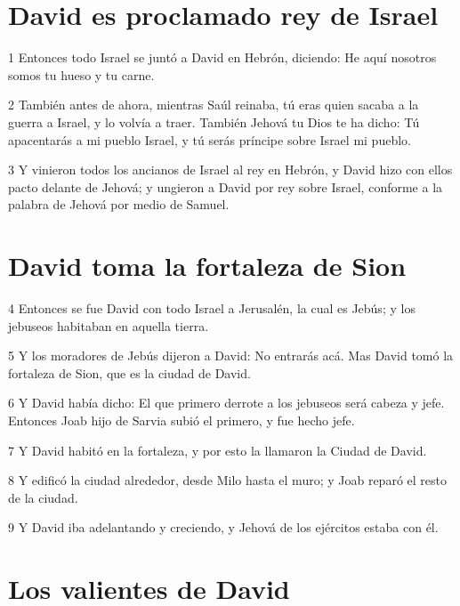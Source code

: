 \section*{David es proclamado rey de Israel}

\par 1 Entonces todo Israel se juntó a David en Hebrón, diciendo: He aquí nosotros somos tu hueso y tu carne.
\par 2 También antes de ahora, mientras Saúl reinaba, tú eras quien sacaba a la guerra a Israel, y lo volvía a traer. También Jehová tu Dios te ha dicho: Tú apacentarás a mi pueblo Israel, y tú serás príncipe sobre Israel mi pueblo.
\par 3 Y vinieron todos los ancianos de Israel al rey en Hebrón, y David hizo con ellos pacto delante de Jehová; y ungieron a David por rey sobre Israel, conforme a la palabra de Jehová por medio de Samuel.

\section*{David toma la fortaleza de Sion}


\par 4 Entonces se fue David con todo Israel a Jerusalén, la cual es Jebús; y los jebuseos habitaban en aquella tierra. 
\par 5 Y los moradores de Jebús dijeron a David: No entrarás acá. Mas David tomó la fortaleza de Sion, que es la ciudad de David.
\par 6 Y David había dicho: El que primero derrote a los jebuseos será cabeza y jefe. Entonces Joab hijo de Sarvia subió el primero, y fue hecho jefe.
\par 7 Y David habitó en la fortaleza, y por esto la llamaron la Ciudad de David.
\par 8 Y edificó la ciudad alrededor, desde Milo hasta el muro; y Joab reparó el resto de la ciudad.
\par 9 Y David iba adelantando y creciendo, y Jehová de los ejércitos estaba con él.

\section*{Los valientes de David}

